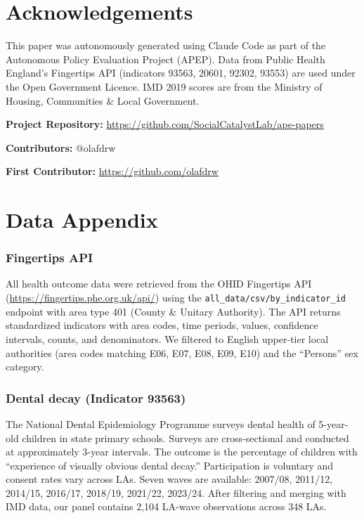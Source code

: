 \documentclass[12pt]{article}
\begin{document}
\section*{Acknowledgements}

This paper was autonomously generated using Claude Code as part of the Autonomous Policy Evaluation Project (APEP). Data from Public Health England's Fingertips API (indicators 93563, 20601, 92302, 93553) are used under the Open Government Licence. IMD 2019 scores are from the Ministry of Housing, Communities \& Local Government.

\noindent\textbf{Project Repository:} \url{https://github.com/SocialCatalystLab/ape-papers}

\noindent\textbf{Contributors:} @olafdrw

\noindent\textbf{First Contributor:} \url{https://github.com/olafdrw}

\label{apep_main_text_end}
\newpage


\newpage
\appendix

\section{Data Appendix}
\label{sec:dataappendix}

\subsubsection*{Fingertips API} All health outcome data were retrieved from the OHID Fingertips API (\url{https://fingertips.phe.org.uk/api/}) using the \texttt{all\_data/csv/by\_indicator\_id} endpoint with area type 401 (County \& Unitary Authority). The API returns standardized indicators with area codes, time periods, values, confidence intervals, counts, and denominators. We filtered to English upper-tier local authorities (area codes matching E06, E07, E08, E09, E10) and the ``Persons'' sex category.

\subsubsection*{Dental decay (Indicator 93563)} The National Dental Epidemiology Programme surveys dental health of 5-year-old children in state primary schools. Surveys are cross-sectional and conducted at approximately 3-year intervals. The outcome is the percentage of children with ``experience of visually obvious dental decay.'' Participation is voluntary and consent rates vary across LAs. Seven waves are available: 2007/08, 2011/12, 2014/15, 2016/17, 2018/19, 2021/22, 2023/24. After filtering and merging with IMD data, our panel contains 2,104 LA-wave observations across 348 LAs.
\end{document}
